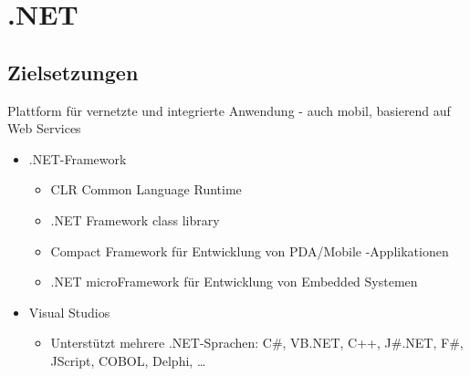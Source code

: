 \section{.NET}
\subsection{Zielsetzungen}
Plattform für vernetzte und integrierte Anwendung - auch mobil, basierend auf Web Services
\begin{itemize}
  \item .NET-Framework
		\begin{itemize}
		\item CLR Common Language Runtime
		\item .NET Framework class library
		\item Compact Framework für Entwicklung von PDA/Mobile -Applikationen
		\item .NET microFramework für Entwicklung von Embedded Systemen
	\end{itemize}
	\item  Visual Studios
	\begin{itemize}
  	\item Unterstützt mehrere .NET-Sprachen: C\#, VB.NET, C++, J\#.NET, F\#, JScript, COBOL, Delphi, \dots	
	\end{itemize}
\end{itemize}

